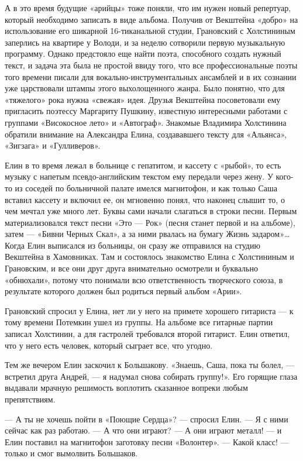 \documentclass[16pt,a5paper,oneside]{book}
\begin{document}
А в это время будущие «арийцы» тоже поняли, что им нужен новый репертуар, который необходимо записать в виде альбома.
Получив от Векштейна «добро» на использование его шикарной 16-тиканальной студии, Грановский с Холстининым заперлись на
квартире у Володи, и за неделю сотворили первую музыкальную программу. Однако предстояло еще найти поэта, способного
создать нужный текст, и задача эта была не простой ввиду того, что все профессиональные поэты того времени писали для
вокально-инструментальных ансамблей и в их сознании уже царствовали штампы этого выхолощенного жанра. Было понятно, что
для «тяжелого» рока нужна «свежая» идея. Друзья Векштейна посоветовали ему пригласить поэтессу Маргариту Пушкину,
известную интересными работами с группами «Високосное лето» и «Автограф». Знакомые Владимира Холстинина обратили
внимание на Александра Елина, создававшего тексту для «Альянса», «Зигзага» и «Гулливеров».

Елин в то время лежал в больнице с гепатитом, и кассету с «рыбой», то есть музыку с напетым псевдо-английским текстом
ему передали через жену. У кого-то из соседей по больничной палате имелся магнитофон, и как только Саша вставил кассету
и включил ее, он мгновенно понял, что наконец слышит то, о чем мечтал уже много лет. Буквы сами начали слагаться в
строки песни. Первым материализовался текст песни «Это — Рок» (песня станет первой и на альбоме), затем — «Бивни Черных
Скал», а за ними рвалась на бумагу Жизнь задаром»\ldots Когда Елин выписался из больницы, он сразу же отправился на
студию Векштейна в Хамовниках. Там и состоялось знакомство Елина с Холстининым и Грановским, и все они друг друга
внимательно осмотрели и буквально «обнюхали», потому что понимали всю ответственность творческого союза, в результате
которого должен был родиться первый альбом «Арии».

Грановский спросил у Елина, нет ли у него на примете хорошего гитариста — к тому времени Потемкин ушел из группы. На
альбоме все гитарные партии записал Холстинин, а для гастролей требовался второй гитарист. Елин ответил, что у него есть
человек, который сыграет все, что угодно.

Тем же вечером Елин заскочил к Большакову. «Знаешь, Саша, пока ты болел, — встретил друга Андрей, — я надумал снова
собирать группу!». Его горящие глаза выдавали мрачную решимость воплотить сказанное вопреки любым препятствиям.

— А ты не хочешь пойти в «Поющие Сердца»? — спросил Елин. — Я с ними сейчас как раз работаю.
— А что они играют?
— А они играют металл! — и Елин поставил на магнитофон заготовку песни «Волонтер».
— Какой класс! — только и смог вымолвить Большаков.
\end{document}
